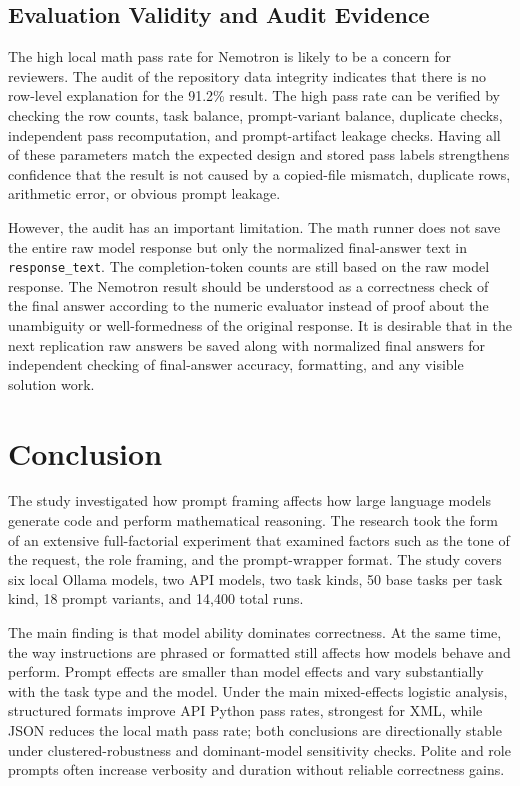 \documentclass{llncs}
\begin{document}
\subsection{Evaluation Validity and Audit Evidence}\label{evaluation-validity-and-audit-evidence}

The high local math pass rate for Nemotron is likely to be a concern for reviewers. The audit of the repository data integrity indicates that there is no row-level explanation for the 91.2\% result. The high pass rate can be verified by checking the row counts, task balance, prompt-variant balance, duplicate checks, independent pass recomputation, and prompt-artifact leakage checks. Having all of these parameters match the expected design and stored pass labels strengthens confidence that the result is not caused by a copied-file mismatch, duplicate rows, arithmetic error, or obvious prompt leakage.

However, the audit has an important limitation. The math runner does not save the entire raw model response but only the normalized final-answer text in \texttt{response\_text}. The completion-token counts are still based on the raw model response. The Nemotron result should be understood as a correctness check of the final answer according to the numeric evaluator instead of proof about the unambiguity or well-formedness of the original response. It is desirable that in the next replication raw answers be saved along with normalized final answers for independent checking of final-answer accuracy, formatting, and any visible solution work.

\section{Conclusion}\label{conclusion}

The study investigated how prompt framing affects how large language models generate code and perform mathematical reasoning. The research took the form of an extensive full-factorial experiment that examined factors such as the tone of the request, the role framing, and the prompt-wrapper format. The study covers six local Ollama models, two API models, two task kinds, 50 base tasks per task kind, 18 prompt variants, and 14,400 total runs.

The main finding is that model ability dominates correctness. At the same time, the way instructions are phrased or formatted still affects how models behave and perform. Prompt effects are smaller than model effects and vary substantially with the task type and the model. Under the main mixed-effects logistic analysis, structured formats improve API Python pass rates, strongest for XML, while JSON reduces the local math pass rate; both conclusions are directionally stable under clustered-robustness and dominant-model sensitivity checks. Polite and role prompts often increase verbosity and duration without reliable correctness gains.
\end{document}
